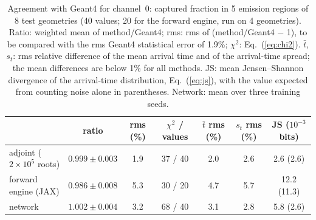 \begin{table}[t]
\centering
\small
\caption{Agreement with Geant4 for channel~0: captured fraction in 5 emission regions of 8 test geometries (40 values;
20 for the forward engine, run on 4 geometries). Ratio: weighted mean of method/Geant4; rms: rms of (method/Geant4 $-$ 1),
to be compared with the rms Geant4 statistical error of 1.9\%; $\chi^2$: Eq.~(\ref{eq:chi2}). $\bar t$, $s_t$: rms
relative difference of the mean arrival time and of the arrival-time spread; the mean differences are below 1\% for all
methods. JS: mean Jensen--Shannon divergence of the arrival-time distribution, Eq.~(\ref{eq:js}), with the value expected
from counting noise alone in parentheses. Network: mean over three training seeds.}
\label{tab:geant4}
\setlength{\tabcolsep}{7pt}
\begin{tabular}{lcccccc}
\hline
 & ratio & rms (\%) & $\chi^2$ / values & $\bar t$ rms (\%) & $s_t$ rms (\%) & JS ($10^{-3}$ bits) \\
\hline
adjoint ($2\times10^5$ roots) & $0.999 \pm 0.003$ & 1.9 & 37 / 40 & 2.0 & 2.6 & 2.6 \;(2.6) \\
forward engine (JAX)          & $0.986 \pm 0.008$ & 5.3 & 30 / 20 & 4.7 & 5.7 & 12.2 \;(11.3) \\
network                       & $1.002 \pm 0.004$ & 3.2 & 68 / 40 & 3.1 & 2.8 & 5.8 \;(2.6) \\
\hline
\end{tabular}
\end{table}